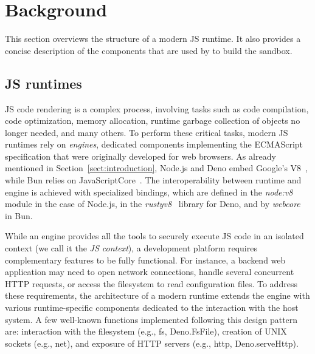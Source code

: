 \section{Background}
\label{sectbackground} 

This section overviews the structure of a modern JS runtime. It also
provides a concise description of the components that are used by \pap
to build the sandbox.

\vspace{-0.52em}
\subsection{JS runtimes}
\label{sect:background-js-runtime}

JS code rendering is a complex process, involving tasks such as code
compilation, code optimization, memory allocation, runtime garbage
collection of objects no longer needed, and many others. To perform
these critical tasks, modern JS runtimes rely on {\em engines},
dedicated components implementing the ECMAScript specification that
were originally developed for web browsers. As already mentioned in
Section~\ref{sect:introduction}, Node.js and Deno embed Google's
V8~\cite{v8-site}, while Bun relies on
JavaScriptCore~\cite{javascriptcore}. The interoperability between
runtime and engine is achieved with specialized bindings, which are
defined in the {\em node:v8}~\cite{node-v8-bindings} module in the
case of Node.js, in the {\em rusty\textunderscore v8}~\cite{rusty-v8}
library for Deno, and by {\em webcore}~\cite{webcore-bindings} in Bun.

While an engine provides all the tools to securely execute JS code in
an isolated context (we call it the {\em JS context}), a development
platform requires complementary features to be fully functional. For
instance, a backend web application may need to open network
connections, handle several concurrent HTTP requests, or access the
filesystem to read configuration files. To address these requirements,
the architecture of a modern runtime extends the engine with various
runtime-specific components dedicated to the interaction with the host
system. A few well-known functions implemented following this design
pattern are: interaction with the filesystem (e.g., fs, Deno.FsFile),
creation of UNIX sockets (e.g., net), and exposure of HTTP servers
(e.g., http, Deno.serveHttp).

